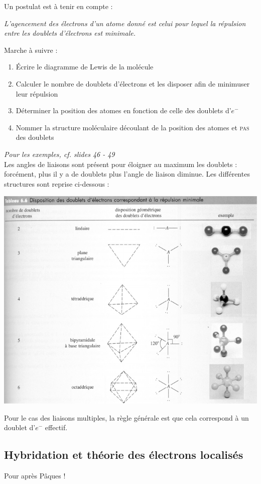 \documentclass[12pt, a4paper]{article}
\begin{document}
Un postulat est à tenir en compte :
\begin{center}
\textit{L'agencement des électrons d'un atome donné est celui pour lequel la répulsion entre les doublets d'électrons est minimale.}\end{center}
Marche à suivre : 
\begin{enumerate}
\item Écrire le diagramme de Lewis de la molécule
\item Calculer le nombre de doublets d'électrons et les disposer afin de minimuser leur répulsion
\item Déterminer la position des atomes en fonction de celle des doublets d'$e^-$
\item Nommer la structure moléculaire découlant de la position des atomes et \textsc{pas} des doublets
\end{enumerate}
\textit{Pour les exemples, cf. slides 46 - 49}\\

Les angles de liaisons sont présent pour éloigner au maximum les doublets : forcément, plus il y a de doublets plus l'angle de liaison diminue. Les différentes structures sont reprise ci-dessous : 
\begin{center}
\includegraphics[scale=0.55]{image12.png}\\
\end{center}
Pour le cas des liaisons multiples, la règle générale est que cela correspond à un doublet d'$e^-$ effectif.


\subsection{Hybridation et théorie des électrons localisés}
Pour après Pâques ! 
\end{document}
